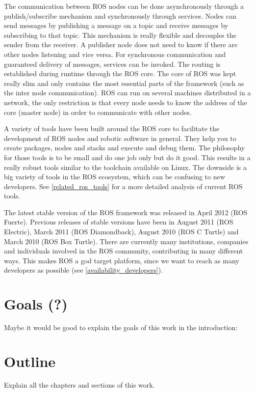 The communication between ROS nodes can be done asynchronously through a publish/subscribe mechanism and synchronously through services. Nodes can send messages by publishing a message on a topic and receive messages by subscribing to that topic. This mechanism is really flexible and decouples the sender from the receiver. A publisher node does not need to know if there are other nodes listening and vice versa. For synchronous communication and guaranteed delivery of messages, services can be invoked. The routing is established during runtime through the ROS core. The core of ROS was kept really slim and only contains the most essential parts of the framework (such as the inter node communication). ROS can run on several machines distributed in a network, the only restriction is that every node needs to know the address of the core (master node) in order to communicate with other nodes.

\review

A variety of tools have been built around the ROS core to facilitate the development of ROS nodes and robotic software in general. They help you to create packages, nodes and stacks and execute and debug them. The philosophy for those tools is to be small and do one job only but do it good. This results in a really robust tools similar to the toolchain available on Linux. The downside is a big variety of tools in the ROS ecosystem, which can be confusing to new developers. See \ref{related_ros_tools} for a more detailed analysis of current ROS tools.

The latest stable version of the ROS framework was released in April 2012 (ROS Fuerte). Previous releases of stable versions have been in August 2011 (ROS Electric), March 2011 (ROS Diamondback), August 2010 (ROS C Turtle) and March 2010 (ROS Box Turtle). There are currently many institutions, companies and individuals involved in the ROS community, contributing in many different ways. This makes ROS a god target platform, since we want to reach as many developers as possible (see \ref{availability_developers}).

\section{Goals (?)}
Maybe it would be good to explain the goals of this work in the introduction: 

\section{Outline}
Explain all the chapters and sections of this work.
